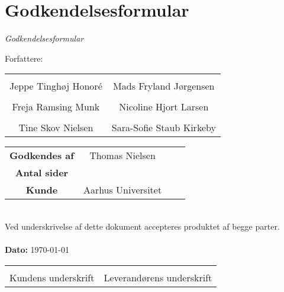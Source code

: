 \chapter{Godkendelsesformular}

{\LARGE\textit{Godkendelsesformular}}

{\large Forfattere:}
\\[5ex]


\begin{tabular}{c c}
\centering 
	\makebox[2.0in]{\hrulefill} & \makebox[2.0in]{\hrulefill}\\
	Jeppe Tinghøj Honoré & Mads Fryland Jørgensen\\[7ex]
	\makebox[2.0in]{\hrulefill} & \makebox[2.0in]{\hrulefill}\\
	Freja Ramsing Munk & Nicoline Hjort Larsen\\[7ex]
	\makebox[2.0in]{\hrulefill} & \makebox[2.0in]{\hrulefill}\\
	Tine Skov Nielsen& Sara-Sofie Staub Kirkeby\\[7ex]

\end{tabular}

\begin{tabular}{c c c c}
	\textbf{Godkendes af} & Thomas Nielsen\\[3ex]
	\textbf{Antal sider} & \pageref{LastPage} \\[3ex]
	\textbf{Kunde} & Aarhus Universitet
\end{tabular}\\[8ex]
Ved underskrivelse af dette dokument accepteres produktet af begge parter.
\\
\\
\textbf{Dato: } \today \\[7ex]

\begin{tabular}{c c}
	\makebox[2.0in]{\hrulefill} & \makebox[2.0in]{\hrulefill}\\
	\centering 
	Kundens underskrift & Leverandørens underskrift
\end{tabular}
